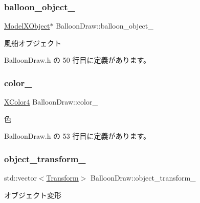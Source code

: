 \subsubsection{\texorpdfstring{balloon\+\_\+object\+\_\+}{balloon\_object\_}}
{\footnotesize\ttfamily \mbox{\hyperlink{class_model_x_object}{Model\+X\+Object}}$\ast$ Balloon\+Draw\+::balloon\+\_\+object\+\_\+\hspace{0.3cm}{\ttfamily [private]}}



風船オブジェクト 



 Balloon\+Draw.\+h の 50 行目に定義があります。

\mbox{\label{class_balloon_draw_ac5fb39cbe0dd2dcdcb40c1edb142c43f}} 
\subsubsection{\texorpdfstring{color\+\_\+}{color\_}}
{\footnotesize\ttfamily \mbox{\hyperlink{_vector3_d_8h_a680c30c4a07d86fe763c7e01169cd6cc}{X\+Color4}} Balloon\+Draw\+::color\+\_\+\hspace{0.3cm}{\ttfamily [private]}}



色 



 Balloon\+Draw.\+h の 53 行目に定義があります。

\mbox{\label{class_balloon_draw_a6135e9a9ecae17f428af4b3d8cc7d95e}} 
\subsubsection{\texorpdfstring{object\+\_\+transform\+\_\+}{object\_transform\_}}
{\footnotesize\ttfamily std\+::vector$<$\mbox{\hyperlink{class_transform}{Transform}}$>$ Balloon\+Draw\+::object\+\_\+transform\+\_\+\hspace{0.3cm}{\ttfamily [private]}}



オブジェクト変形 



